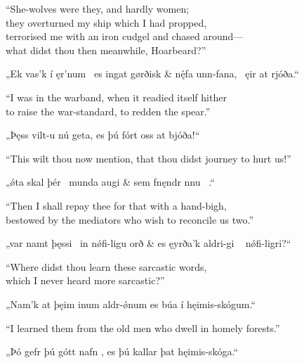 \bvb “She-wolves were they, and hardly women; \\
they overturned my ship which I had propped, \\
terrorised me with an iron cudgel and chased  around— \\
\ind what didst thou then meanwhile, Hoarbeard?”\evb\evg


\bvg\bva{}%
„Ek vas’k í ęr’num \hld\ es ingat gørðisk &
nę́fa unn-fana, \hld\ ęir at rjóða.“\eva

\bvb “I was in the warband, when it readied itself hither \\
to raise the war-standard, to redden the spear.”\evb\evg


\bvg\bva{}%
„Þęss vilt-u nú geta, es þú fórt oss  at bjóða!“\eva

\bvb “This wilt thou now mention, that thou didst journey to hurt us!”\evb\evg


\bvg\bva{}%
„ǿta skal þér  \hld\ munda augi &
sem fnęndr nnu \hld\ .“\eva

\bvb “Then I shall repay thee for that with a hand-bigh, \\
bestowed by the mediators who wish to reconcile us two.”\evb\evg


\bvg\bva{}%
„var namt þęssi \hld\ in nǿfi-ligu orð &
es ęyrða’k aldri-gi \hld\  nǿfi-ligri?“\eva

\bvb “Where didst thou learn these sarcastic words, \\
which I never heard more sarcastic?”\evb\evg


\bvg\bva{}%
„Nam’k at  þęim inum aldr-ǿnum es búa í hęimis-skógum.“\eva

\bvb “I learned them from the old men who dwell in homely forests.”\evb\evg


\bvg\bva{}%
„Þó gefr þú gótt nafn , es þú kallar þat hęimis-skóga.“\eva


